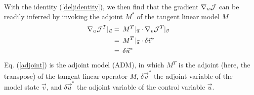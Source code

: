 %
With the identity (\ref{deljidentity}), we then find that
the gradient $ \nabla _{u}{\cal J} $ can be readily inferred by 
invoking the adjoint $ M^{\ast } $ of the tangent linear model $ M $
%
\begin{equation}
\begin{aligned}
\nabla _{u}{\cal J}^T |_{\vec{u}} & 
= \, M^T |_{\vec{u}} \cdot \nabla _{v}{\cal J}^T |_{\vec{v}}  \\
~ & = \, M^T |_{\vec{u}} \cdot \delta \vec{v}^{\ast} \\
~ & = \, \delta \vec{u}^{\ast}
\end{aligned}
\label{adjoint}
\end{equation}
%
Eq. (\ref{adjoint}) is the {\sf adjoint model (ADM)}, 
in which $M^T$ is the adjoint (here, the transpose) of the 
tangent linear operator $M$, $ \delta \vec{v}^{\ast} $ 
the adjoint variable of the model state $ \vec{v} $, and
$ \delta \vec{u}^{\ast} $ the adjoint variable of the control variable $ \vec{u} $.

